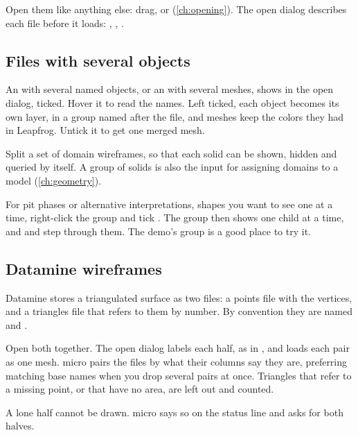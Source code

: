 Open them like anything else: drag, or  (\cref{ch:opening}). The open dialog describes each file before it loads: , , .

\subsection{Files with several objects}

An  with several named objects, or an  with several meshes, shows  in the open dialog, ticked. Hover it to read the names. Left ticked, each object becomes its own layer, in a group named after the file, and  meshes keep the colors they had in Leapfrog. Untick it to get one merged mesh.

Split a set of domain wireframes, so that each solid can be shown, hidden and queried by itself. A group of solids is also the input for assigning domains to a model (\cref{ch:geometry}).

\begin{tip}
For pit phases or alternative interpretations, shapes you want to see one at a time, right-click the group and tick . The group then shows one child at a time, and \key{\{} and \key{\}} step through them. The demo's  group is a good place to try it.
\end{tip}

\subsection{Datamine wireframes}\label{sec:meshes-dm}

Datamine stores a triangulated surface as two  files: a points file with the vertices, and a triangles file that refers to them by number. By convention they are named  and .

Open both together. The open dialog labels each half, as in , and loads each pair as one mesh. micro pairs the files by what their columns say they are, preferring matching base names when you drop several pairs at once. Triangles that refer to a missing point, or that have no area, are left out and counted.

A lone half cannot be drawn. micro says so on the status line and asks for both halves.

